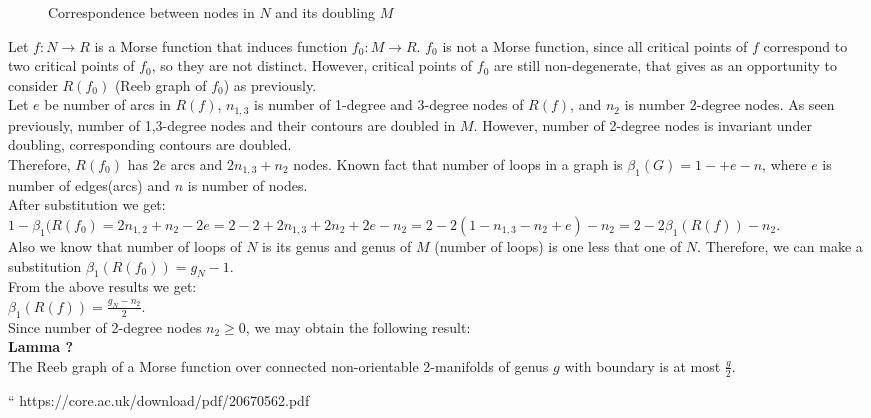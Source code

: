 \documentclass[]{article}
\begin{document}
\begin{figure}[h!]
\caption{Correspondence between nodes in $N$ and its doubling $M$}
\label{fig:Nodes}
\end{figure}
Let $f: N \rightarrow R$ is a Morse function that induces function $f_0: M \rightarrow R$. $f_0$ is not a Morse function, since all critical points of $f$ correspond to two critical points of $f_0$, so they are not distinct. However, critical points of $f_0$ are still non-degenerate, that gives as an opportunity to consider $R(f_0)$ (Reeb graph of $f_0$) as previously. \\
Let $e$ be number of arcs in $R(f)$, $n_{1,3}$ is number of 1-degree and 3-degree nodes of $R(f)$, and $n_2$ is number 2-degree nodes. As seen previously, number of 1,3-degree nodes and their contours are doubled in $M$. However, number of 2-degree nodes is invariant under doubling, corresponding contours are doubled. \\
Therefore, $R(f_0)$ has $2e$ arcs and $2n_{1,3}+n_2$ nodes. Known fact that number of loops in a graph is $\beta_1 (G)=1-+e-n$, where $e$ is number of edges(arcs) and $n$ is number of nodes. \\
After substitution we get:\\
$1-\beta_1(R(f_0)=2n_{1,2}+n_2-2e=2-2+2n_{1,3}+2n_2+2e-n_2=2-2(1-n_{1,3}-n_2+e)-n_2=2-2\beta_1(R(f))-n_2$. \\
Also we know that number of loops of $N$ is its genus and genus of $M$ (number of loops) is one less that one of $N$. Therefore, we can make a substitution $\beta_1(R(f_0))=g_N-1$. \\
From the above results we get: \\
$\beta_1(R(f))=\frac{g_N-n_2}{2}$.\\
Since number of 2-degree nodes $n_2\geq0 $, we may obtain the following result:\\
\textbf{Lamma ?}\\
The Reeb graph of a Morse function over connected non-orientable 2-manifolds of genus $g$ with boundary is at most $\frac{g}{2}$.\\

\begin{thebibliography}{9}
         {\sc }
         `` https://core.ac.uk/download/pdf/20670562.pdf
\end{thebibliography}
\end{document}
